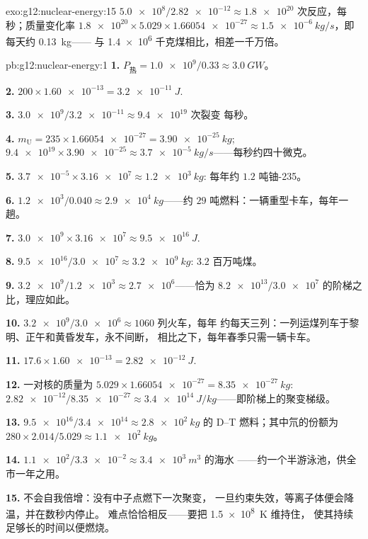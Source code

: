 \begin{solution}{exo:g12:nuclear-energy:15}
$\num{5.0e8}/\num{2.82e-12} \approx \num{1.8e20}$ 次反应，每
秒；质量变化率 $\num{1.8e20} \times 5.029 \times \num{1.66054e-27}
\approx \qty{1.5e-6}{kg/s}$，即每天约 \qty{0.13}{kg}——
与 \num{1.4e6} 千克煤相比，相差一千万倍。
\end{solution}

\begin{solution}{pb:g12:nuclear-energy:1}
\textbf{1.} $P_{\text{热}} = \num{1.0e9}/0.33 \approx \qty{3.0}{GW}$。

\textbf{2.} $200 \times \num{1.60e-13} = \qty{3.2e-11}{J}$.

\textbf{3.} $\num{3.0e9}/\num{3.2e-11} \approx \num{9.4e19}$ 次裂变
每秒。

\textbf{4.} $m_{\mathrm U} = 235 \times \num{1.66054e-27} =
\qty{3.90e-25}{kg}$; $\num{9.4e19} \times \num{3.90e-25} \approx
\qty{3.7e-5}{kg/s}$——每秒约四十微克。

\textbf{5.} $\num{3.7e-5} \times \num{3.16e7} \approx \qty{1.2e3}{kg}$:
每年约 $1.2$ 吨铀-235。

\textbf{6.} $\num{1.2e3}/0.040 \approx \qty{2.9e4}{kg}$——约 $29$
吨燃料：一辆重型卡车，每年一趟。

\textbf{7.} $\num{3.0e9} \times \num{3.16e7} \approx \qty{9.5e16}{J}$.

\textbf{8.} $\num{9.5e16}/\num{3.0e7} \approx \qty{3.2e9}{kg}$: $3.2$
百万吨煤。

\textbf{9.} $\num{3.2e9}/\num{1.2e3} \approx \num{2.7e6}$——恰为
$\num{8.2e13}/\num{3.0e7}$ 的阶梯之比，理应如此。

\textbf{10.} $\num{3.2e9}/\num{3.0e6} \approx 1060$ 列火车，每年
约每天三列：一列运煤列车于黎明、正午和黄昏发车，永不间断，
相比之下，每年春季只需一辆卡车。

\textbf{11.} $17.6 \times \num{1.60e-13} = \qty{2.82e-12}{J}$.

\textbf{12.} 一对核的质量为 $5.029 \times \num{1.66054e-27} =
\qty{8.35e-27}{kg}$: $\num{2.82e-12}/\num{8.35e-27} \approx
\qty{3.4e14}{J/kg}$——即阶梯上的聚变梯级。

\textbf{13.} $\num{9.5e16}/\num{3.4e14} \approx \qty{2.8e2}{kg}$ 的 D--T
燃料；其中氘的份额为 $280 \times 2.014/5.029 \approx \qty{1.1e2}{kg}$。

\textbf{14.} $\num{1.1e2}/\num{3.3e-2} \approx \qty{3.4e3}{m^3}$ 的海水
——约一个半游泳池，供全市一年之用。

\textbf{15.} 不会自我倍增：没有中子点燃下一次聚变，
一旦约束失效，等离子体便会降温，并在数秒内停止。
难点恰恰相反——要把 \qty{1.5e8}{K} 维持住，
使其持续足够长的时间以便燃烧。


\end{solution}

